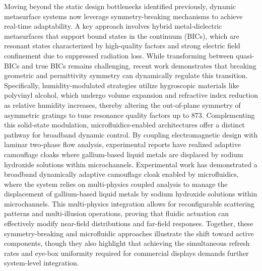 Moving beyond the static design bottlenecks identified previously, dynamic metasurface systems now leverage symmetry-breaking mechanisms to achieve real-time adaptability. A key approach involves hybrid metal-dielectric metasurfaces that support bound states in the continuum (BICs), which are resonant states characterized by high-quality factors and strong electric field confinement due to suppressed radiation loss. While transforming between quasi-BICs and true BICs remains challenging, recent work demonstrates that breaking geometric and permittivity symmetry can dynamically regulate this transition. Specifically, humidity-modulated strategies utilize hygroscopic materials like polyvinyl alcohol, which undergo volume expansion and refractive index reduction as relative humidity increases, thereby altering the out-of-plane symmetry of asymmetric gratings to tune resonance quality factors up to 873. \citep{doi_10_1002_adpr_202400191_88f03cd9} \citep{doi_10_1364_oe_574568_72469f3c} Complementing this solid-state modulation, microfluidics-enabled architectures offer a distinct pathway for broadband dynamic control. By coupling electromagnetic design with laminar two-phase flow analysis, experimental reports have realized adaptive camouflage cloaks where gallium-based liquid metals are displaced by sodium hydroxide solutions within microchannels. Experimental work has demonstrated a broadband dynamically adaptive camouflage cloak enabled by microfluidics, where the system relies on multi-physics coupled analysis to manage the displacement of gallium-based liquid metals by sodium hydroxide solutions within microchannels. \citep{doi_10_1002_lpor_202500327_a3bf6deb} This multi-physics integration allows for reconfigurable scattering patterns and multi-illusion operations, proving that fluidic actuation can effectively modify near-field distributions and far-field responses. Together, these symmetry-breaking and microfluidic approaches illustrate the shift toward active components, though they also highlight that achieving the simultaneous refresh rates and eye-box uniformity required for commercial displays demands further system-level integration. \citep{doi_10_1002_adpr_202400191_88f03cd9} \citep{doi_10_1002_lpor_202500327_a3bf6deb}

